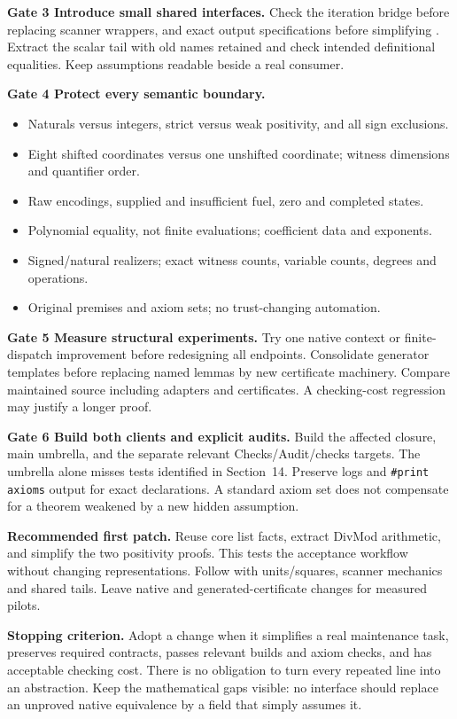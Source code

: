 \documentclass[11pt,letterpaper]{article}
\newcommand{\code}[1]{{\small\texttt{\detokenize{#1}}}}
\begin{document}
\textbf{Gate 3 Introduce small shared interfaces.} Check the iteration bridge before replacing scanner wrappers, and exact output specifications before simplifying \code{step_cons}. Extract the scalar tail with old names retained and check intended definitional equalities. Keep assumptions readable beside a real consumer.

\textbf{Gate 4 Protect every semantic boundary.}
\begin{itemize}
\item Naturals versus integers, strict versus weak positivity, and all sign exclusions.
\item Eight shifted coordinates versus one unshifted coordinate; witness dimensions and quantifier order.
\item Raw encodings, supplied and insufficient fuel, zero and completed states.
\item Polynomial equality, not finite evaluations; coefficient data and exponents.
\item Signed/natural realizers; exact witness counts, variable counts, degrees and operations.
\item Original premises and axiom sets; no trust-changing automation.
\end{itemize}

\textbf{Gate 5 Measure structural experiments.} Try one native context or finite-dispatch improvement before redesigning all endpoints. Consolidate generator templates before replacing named lemmas by new certificate machinery. Compare maintained source including adapters and certificates. A checking-cost regression may justify a longer proof.

\textbf{Gate 6 Build both clients and explicit audits.} Build the affected closure, main umbrella, and the separate relevant Checks/Audit/checks targets. The umbrella alone misses tests identified in Section~14. Preserve logs and \texttt{\#print axioms} output for exact declarations. A standard axiom set does not compensate for a theorem weakened by a new hidden assumption.

\textbf{Recommended first patch.} Reuse core list facts, extract DivMod arithmetic, and simplify the two positivity proofs. This tests the acceptance workflow without changing representations. Follow with units/squares, scanner mechanics and shared tails. Leave native and generated-certificate changes for measured pilots.

\textbf{Stopping criterion.} Adopt a change when it simplifies a real maintenance task, preserves required contracts, passes relevant builds and axiom checks, and has acceptable checking cost. There is no obligation to turn every repeated line into an abstraction. Keep the mathematical gaps visible: no interface should replace an unproved native equivalence by a field that simply assumes it.
\end{document}

